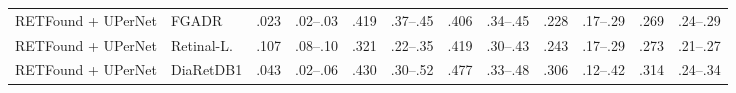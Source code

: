 \begin{landscape}
{\begin{longtable}{l l c c c c c c c c c c}
RETFound + UPerNet & FGADR & .023 & \scriptsize .02--.03 & .419 & \scriptsize .37--.45 & .406 & \scriptsize .34--.45 & .228 & \scriptsize .17--.29 & .269 & \scriptsize .24--.29 \\
RETFound + UPerNet & Retinal-L. & .107 & \scriptsize .08--.10 & .321 & \scriptsize .22--.35 & .419 & \scriptsize .30--.43 & .243 & \scriptsize .17--.29 & .273 & \scriptsize .21--.27 \\
RETFound + UPerNet & DiaRetDB1 & .043 & \scriptsize .02--.06 & .430 & \scriptsize .30--.52 & .477 & \scriptsize .33--.48 & .306 & \scriptsize .12--.42 & .314 & \scriptsize .24--.34 \\
\end{longtable}
}
\vspace{-6pt}
\end{landscape}